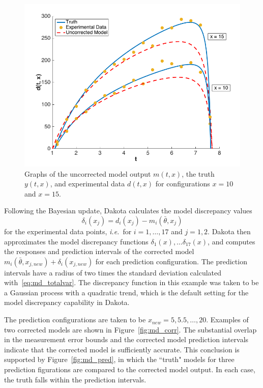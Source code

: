 \begin{figure}[t]
\begin{center}
\includegraphics[width=.6\textwidth]{images/moddiscrep_TruthExpModel.png}
\end{center}
\vspace{-0.5cm}
\caption{Graphs of the uncorrected model output $m(t,x)$, the truth $y(t,x)$,
and experimental data $d(t,x)$ for configurations $x = 10$ and $x = 15$.}
\label{fig:md_uncorr}
\end{figure}

Following the Bayesian update, Dakota calculates the model discrepancy values
\begin{equation}\label{eq:md_discrep}
\delta_i(x_j) = d_i(x_j) - m_i(\bar{\theta}, x_j)
\end{equation}
for the experimental data points, \textit{i.e.}\ for $i = 1, \ldots, 17$ and
$j = 1,2$. Dakota then approximates the model discrepancy functions 
$\delta_1(x), \ldots \delta_{17}(x)$, and computes the responses and
prediction intervals of the corrected model $m_i(\bar{\theta}, x_{j,new}) 
+ \delta_i(x_{j,new})$ for each prediction configuration. The prediction
intervals have a radius of two times the standard deviation calculated 
with~\ref{eq:md_totalvar}. The discrepancy function in this example was taken
to be a Gaussian process with a quadratic trend, which is the default setting
for the model discrepancy capability in Dakota.

The prediction configurations are taken to be $x_{new} = 5, 5.5, \ldots, 20$. 
Examples of two corrected models are shown in Figure~\ref{fig:md_corr}. The
substantial overlap in the measurement error bounds and the corrected model
prediction intervals indicate that the corrected model is sufficiently accurate.
This conclusion is supported by Figure~\ref{fig:md_pred}, in which the
``truth" models for three prediction figurations are compared to the corrected
model output. In each case, the truth falls within the prediction intervals.

